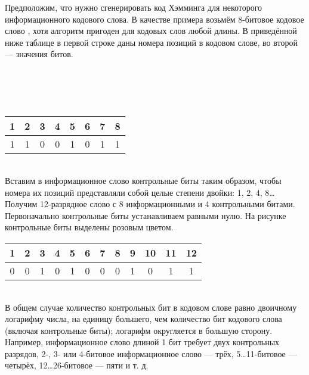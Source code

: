 \documentclass[a4paper,12pt]{article}
\begin{document}
Предположим, что нужно сгенерировать код Хэмминга для некоторого информационного кодового слова. В качестве примера возьмём 8-битовое кодовое слово , хотя алгоритм пригоден для кодовых слов любой длины. В приведённой ниже таблице в первой строке даны номера позиций в кодовом слове, во второй — значения битов.\\
\\
\\
\\
\\
\begin{table}[!h]
\begin{center}
\begin{tabular}{|c|c|c|c|c|c|c|c|}
\hline
1&2&3&4&5&6&7&8\\
\hline
1&1&0&0&1&0&1&1\\
\hline
\end{tabular}
\end{center}
\end{table}\\

Вставим в информационное слово контрольные биты таким образом, чтобы номера их позиций представляли собой целые степени двойки: 1, 2, 4, 8… Получим 12-разрядное слово с 8 информационными и 4 контрольными битами. Первоначально контрольные биты устанавливаем равными нулю. На рисунке контрольные биты выделены розовым цветом.\\
\begin{table}[!h]
\begin{center}
\begin{tabular}{|c|c|c|c|c|c|c|c|c|c|c|c|}
\hline
1&2&3&4&5&6&7&8&9&10&11&12\\
\hline
\cellcolor{Red}0&\cellcolor{Red}0&1&\cellcolor{Red}0&1&0&0&\cellcolor{Red}0&1&0&1&1\\
\hline
\end{tabular}
\end{center}
\end{table}\\
В общем случае количество контрольных бит в кодовом слове равно двоичному логарифму числа, на единицу большего, чем количество бит кодового слова (включая контрольные биты); логарифм округляется в большую сторону. Например, информационное слово длиной 1 бит требует двух контрольных разрядов, 2-, 3- или 4-битовое информационное слово — трёх, 5…11-битовое — четырёх, 12…26-битовое — пяти и т. д. \\
\end{document}

